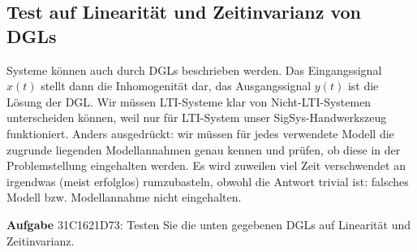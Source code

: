 \subsection{Test auf Linearität und Zeitinvarianz von DGLs}
\label{sec:31C1621D73}
\begin{Ziel}
Systeme können auch durch DGLs beschrieben werden. Das Eingangssignal $x(t)$
stellt dann die Inhomogenität dar, das Ausgangssignal $y(t)$ ist die Lösung der DGL.
%
Wir müssen LTI-Systeme klar von Nicht-LTI-Systemen unterscheiden können, weil
nur für LTI-System unser SigSys-Handwerkszeug funktioniert. Anders ausgedrückt: wir müssen für jedes verwendete Modell die zugrunde liegenden Modellannahmen genau kennen und prüfen, ob diese in der Problemstellung eingehalten werden. Es wird zuweilen viel Zeit verschwendet an irgendwas (meist erfolglos) rumzubasteln, obwohl die Antwort trivial ist: falsches Modell bzw. Modellannahme nicht eingehalten.
\end{Ziel}
\textbf{Aufgabe} {\tiny 31C1621D73}: Testen Sie die unten gegebenen DGLs auf
Linearität und Zeitinvarianz.
